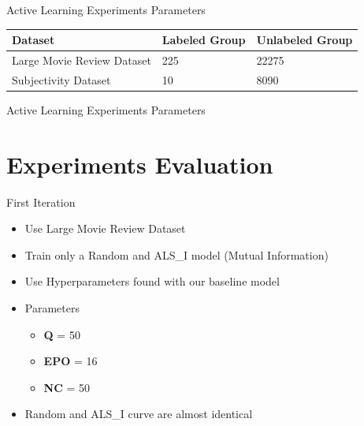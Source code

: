 \documentclass[10pt]{beamer}
\begin{document}
\begin{frame}[fragile]{Active Learning Experiments Parameters}
\begin{table}[]
\centering
\begin{tabular}{lll}
\toprule
Dataset & Labeled Group & Unlabeled Group\\
\midrule
\rowcolor{black!20}  Large Movie Review Dataset & 225 & 22275\\
Subjectivity Dataset & 10 & 8090\\
\bottomrule
\end{tabular}
\end{table}
\end{frame}

\begin{frame}[fragile]{Active Learning Experiments Parameters}
\begin{table}
\centering
{}
\end{table}
\end{frame}


\section{Experiments Evaluation}

\begin{frame}[fragile]{First Iteration}
    \begin{itemize}
        \item Use Large Movie Review Dataset
        \item Train only a Random and ALS\_I model (Mutual Information)
        \item Use Hyperparameters found with our baseline model
        \item Parameters
            \begin{itemize}
            \item \textbf{Q} = 50
            \item \textbf{EPO} = 16
            \item \textbf{NC} = 50
            \end{itemize}
        \item Random and ALS\_I curve are almost identical
    \end{itemize}
\end{frame}
\end{document}
